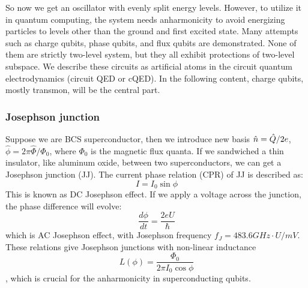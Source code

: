 So now we get an oscillator with evenly split energy levels. However, to utilize it in quantum computing, the system needs anharmonicity to avoid energizing particles to levels other than the ground and first excited state. Many attempts\cite{RN18, RN19, RN20} such as charge qubits, phase qubits, and flux qubits are demonstrated. None of them are strictly two-level system, but they all exhibit protections of two-level subspace. We describe these circuits as artificial atoms in the circuit quantum electrodynamics (circuit QED or cQED)\cite{RN15, RN1, RN8}. In the following content, charge qubits, mostly transmon, will be the central part.

\subsubsection{Josephson junction}
Suppose we are BCS superconductor\cite{RN36}, then we introduce new basis $\Hat{n} = \hat{Q}/2e$, $\hat{\phi} = {2\pi \hat{\Phi}} / {\Phi_0}$, where $\Phi_0$ is the magnetic flux quanta. If we sandwiched a thin insulator, like aluminum oxide, between two superconductors, we can get a Josephson junction (JJ). The current phase relation (CPR) of JJ is described as\cite{RN14}:
\begin{equation}
I = I_0\sin{\phi}    
\end{equation}
This is known as DC Josephson effect. If we apply a voltage across the junction, the phase difference will evolve:
\begin{equation}
    \frac{d\phi}{dt} = \frac{2eU}{\hbar}
\end{equation}
which is AC Josephson effect, with Josephson frequency $f_J = 483.6 GHz \cdot  U/ mV$. These relations give Josephson junctions with non-linear inductance
\begin{equation}
L(\phi) = \frac{\Phi_0}{2\pi I_0 \cos{\phi}}    
\end{equation}, which is crucial for the anharmonicity in superconducting qubits.

